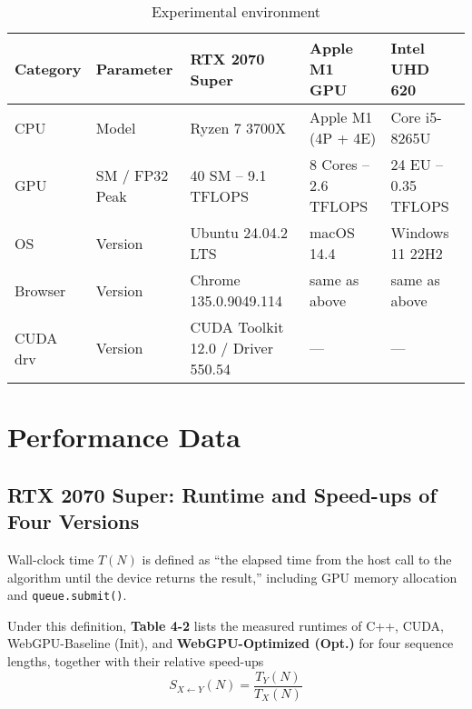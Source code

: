 \documentclass[PhD]{PHlab-thesis}
\begin{document}
\begin{table}[htbp]
  \centering
  \caption{Experimental environment}
  \label{tab:exp_env}

  \setlength{\tabcolsep}{8pt}         %
  \renewcommand{\arraystretch}{1.4}   %

  \begin{tabularx}{\textwidth}{@{}lX X X X@{}}
    \toprule
    Category & Parameter & RTX 2070 Super & Apple M1 GPU & Intel UHD 620 \\
    \midrule
    CPU      & Model                 & Ryzen 7 3700X        & Apple M1 (4P + 4E) & Core i5-8265U \\
    GPU      & SM / FP32 Peak        & 40 SM – 9.1 TFLOPS   & 8 Cores – 2.6 TFLOPS & 24 EU – 0.35 TFLOPS \\
    OS       & Version               & Ubuntu 24.04.2 LTS   & macOS 14.4           & Windows 11 22H2 \\
    Browser  & Version               & Chrome 135.0.9049.114 & same as above                & same as above \\
    CUDA drv & Version               & CUDA Toolkit 12.0 / Driver 550.54 & — & — \\
    \bottomrule
  \end{tabularx}
\end{table}



\section{Performance Data}
\subsection{RTX 2070 Super: Runtime and Speed-ups of Four Versions}
Wall-clock time $T(N)$ is defined as ``the elapsed time from the host call to the algorithm until the device returns the result,'' including GPU memory allocation and \texttt{queue.submit()}.

Under this definition, \textbf{Table 4-2} lists the measured runtimes of C++, CUDA, WebGPU-Baseline (Init), and \textbf{WebGPU-Optimized (Opt.)} for four sequence lengths, together with their relative speed-ups
\[
S_{X \leftarrow Y}(N) = \frac{T_Y(N)}{T_X(N)}
\]
\end{document}
